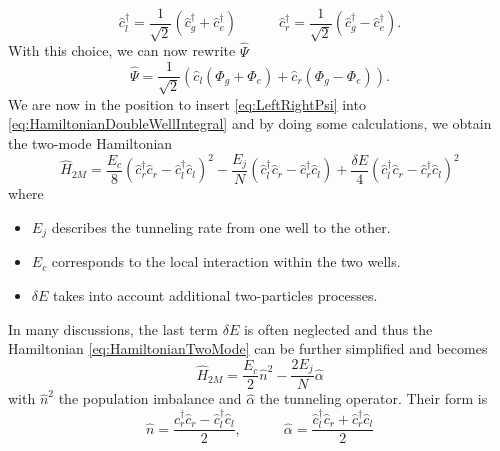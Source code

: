 \begin{equation}
	\label{eq:LeftRightOperators}
	\hat{c}_l^{\dagger} = \frac{1}{\sqrt{2}  }\left( \hat{c}_g^{\dagger} + \hat{c}_e^{\dagger} \right)   \hspace{3em}\hat{c}_r^{\dagger} = \frac{1}{\sqrt{2}  }\left( \hat{c}_g^{\dagger} - \hat{c}_e^{\dagger} \right)  .
\end{equation}
With this choice, we can now rewrite $ \hat{\Psi} $
\begin{equation}
	\label{eq:LeftRightPsi}
	\hat{\Psi} = \frac{1}{\sqrt{2}}\left( \hat{c}_l(\Phi_g + \Phi_e) + \hat{c}_r(\Phi_g - \Phi_e) \right).
\end{equation}
We are now in the position to insert \cref{eq:LeftRightPsi} into \cref{eq:HamiltonianDoubleWellIntegral} and by doing some calculations, we obtain the two-mode Hamiltonian
\begin{equation}
	\label{eq:HamiltonianTwoMode}
	\hat{H}_{2M} = \frac{E_{c}}{8}\left(\hat{c}_{r}^\dagger\hat{c}_{r} - \hat{c}_{l}^\dagger\hat{c}_{l}\right)^2 - \frac{ E_{j} }{N} \left(\hat{c}_{l}^\dagger\hat{c}_{r} - \hat{c}_{r}^\dagger\hat{c}_{l}\right) + \frac{\delta E}{4} \left(\hat{c}_{l}^\dagger\hat{c}_{r} - \hat{c}_{r}^\dagger\hat{c}_{l}\right)^{2}
\end{equation}
where
\begin{itemize}
	\item $ E_{j} $ describes the tunneling rate from one well to the other.
	\item $ E_{c} $ corresponds to the local interaction within the two wells.
	\item $ \delta E $ takes into account additional two-particles processes.
\end{itemize}
In many discussions, the last term $ \delta E $ is often neglected and thus the Hamiltonian \cref{eq:HamiltonianTwoMode} can be further simplified and becomes
\begin{equation}
	\label{eq:HamiltonianTwoModeFinal}
	\hat{H}_{2M} = \frac{E_{c}}{2} \hat{n}^2 - \frac{2E_{j}}{N}\hat{\alpha}
\end{equation}
with $ \hat{n}^2 $ the population imbalance and $\hat{\alpha}$ the tunneling operator.
Their form is
\begin{equation}
	\label{eq:JosephsonJuncitionOperators}
	\hat{n} = \frac{\hat{c}_{r}^\dagger\hat{c}_{r} - \hat{c}_{l}^\dagger\hat{c}_{l}}{2}, \hspace{3em} \hat{ \alpha } = \frac{ \hat{c}_{l}^\dagger\hat{c}_{r} + \hat{c}_{r}^\dagger\hat{c}_{l}}{2}
\end{equation}
